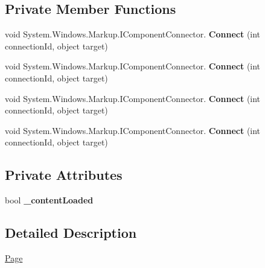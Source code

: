 \subsection*{Private Member Functions}
\begin{DoxyCompactItemize}
\item 
\mbox{\label{class_t_h_b___plugin___social_1_1_personal_statistic_1_1_page_a8832b1db414283df7eacd9d9608ca48e}} 
void System.\+Windows.\+Markup.\+I\+Component\+Connector. {\bfseries Connect} (int connection\+Id, object target)
\item 
\mbox{\label{class_t_h_b___plugin___social_1_1_personal_statistic_1_1_page_a8832b1db414283df7eacd9d9608ca48e}} 
void System.\+Windows.\+Markup.\+I\+Component\+Connector. {\bfseries Connect} (int connection\+Id, object target)
\item 
\mbox{\label{class_t_h_b___plugin___social_1_1_personal_statistic_1_1_page_a8832b1db414283df7eacd9d9608ca48e}} 
void System.\+Windows.\+Markup.\+I\+Component\+Connector. {\bfseries Connect} (int connection\+Id, object target)
\item 
\mbox{\label{class_t_h_b___plugin___social_1_1_personal_statistic_1_1_page_a8832b1db414283df7eacd9d9608ca48e}} 
void System.\+Windows.\+Markup.\+I\+Component\+Connector. {\bfseries Connect} (int connection\+Id, object target)
\end{DoxyCompactItemize}
\subsection*{Private Attributes}
\begin{DoxyCompactItemize}
\item 
\mbox{\label{class_t_h_b___plugin___social_1_1_personal_statistic_1_1_page_a273ec20dec2a7f6ba46f849887ad7f60}} 
bool {\bfseries \+\_\+content\+Loaded}
\end{DoxyCompactItemize}


\subsection{Detailed Description}
\mbox{\hyperlink{class_t_h_b___plugin___social_1_1_personal_statistic_1_1_page}{Page}} 

